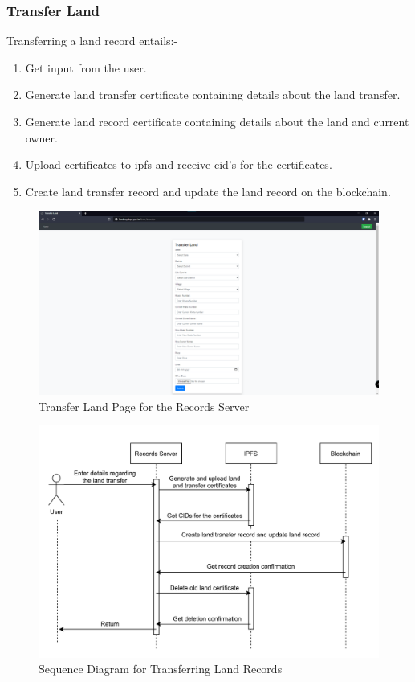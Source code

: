 \documentclass[12pt]{article}
\begin{document}
        \subsubsection{Transfer Land}
            Transferring a land record entails:-
            \begin{enumerate}
                \item Get input from the user.
                \item Generate land transfer certificate containing details about the land transfer.
                \item Generate land record certificate containing details about the land and current owner.
                \item Upload certificates to \acrshort{ipfs} and receive \acrshort{cid}'s for the certificates.
                \item Create land transfer record and update the land record on the blockchain.
            \end{enumerate}
            \begin{figure}[htbp]
                \includegraphics[scale=0.25]{records_transfer}
                \centering
                \caption{Transfer Land Page for the Records Server}
            \end{figure}

            \begin{figure}[htbp]
                \includegraphics[scale=0.25]{records_seq_transfer}
                \centering
                \caption{Sequence Diagram for Transferring Land Records}
            \end{figure}
\end{document}
